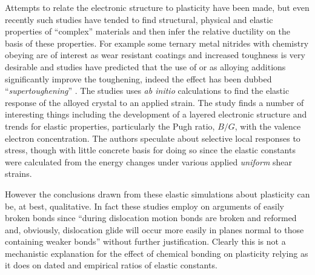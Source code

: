 %
%
%
%
%
%
%
%
%
%
%
%

Attempts to relate the electronic structure to plasticity have been made, but even recently such studies have tended to find structural, physical and elastic properties of ``complex'' materials and then infer the relative ductility on the basis of these properties. For example some ternary metal nitrides with chemistry obeying  are of interest as wear resistant coatings and increased toughness is very desirable and studies have predicted that the use of  or  as alloying additions significantly improve the toughening, indeed the effect has been dubbed ``\emph{supertoughening}'' \cite{Sangiovanni2010,Sangiovanni2011}. The studies uses \emph{ab initio} calculations to find the elastic response of the alloyed crystal to an applied strain. The study finds a number of interesting things including the development of a layered electronic structure and trends for elastic properties, particularly the Pugh ratio, $B/G$, with the valence electron concentration. The authors speculate about selective local responses to stress, though with little concrete basis for doing so since the elastic constants were calculated from the energy changes under various applied \emph{uniform} shear strains.

However the conclusions drawn from these elastic simulations about plasticity can be, at best, qualitative. In fact these studies employ on arguments of easily broken bonds since ``during dislocation motion bonds are broken and reformed and, obviously, dislocation glide will occur more easily in planes normal to those containing weaker bonds'' \cite{Sangiovanni2011} without further justification. Clearly this is not a mechanistic explanation for the effect of chemical bonding on plasticity relying as it does on dated and empirical ratios of elastic constants.

